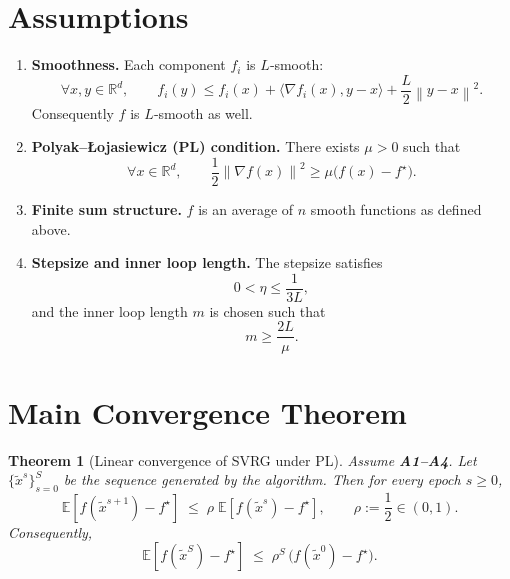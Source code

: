 \documentclass{article}
\newtheorem{theorem}{Theorem}
\newcommand{\E}{\mathbb{E}}
\newcommand{\R}{\mathbb{R}}
\newcommand{\norm}[1]{\left\|#1\right\|}
\newcommand{\inner}[2]{\langle #1,#2\rangle}
\newcommand{\grad}{\nabla}
\begin{document}
\section*{Assumptions}
\begin{enumerate}[label={A\arabic*}:, leftmargin=*, nosep]
\item \textbf{Smoothness.} Each component $f_i$ is $L$‑smooth:
\[
\forall x,y\in\R^{d},\qquad
f_i(y)\le f_i(x)+\inner{\grad f_i(x)}{y-x}+\frac{L}{2}\norm{y-x}^{2}.
\tag{A1}
\]
Consequently $f$ is $L$‑smooth as well.

\item \textbf{Polyak–\L{}ojasiewicz (PL) condition.} There exists $\mu>0$ such that
\[
\forall x\in\R^{d},\qquad
\frac{1}{2}\norm{\grad f(x)}^{2}\ge \mu\bigl(f(x)-f^{\star}\bigr).
\tag{A2}
\]

\item \textbf{Finite sum structure.} $f$ is an average of $n$ smooth functions as defined above.

\item \textbf{Stepsize and inner loop length.} The stepsize satisfies
\[
0<\eta\le \frac{1}{3L},
\tag{A3}
\]
and the inner loop length $m$ is chosen such that
\[
m\ge \frac{2L}{\mu}.
\tag{A4}
\]
\end{enumerate}

\section*{Main Convergence Theorem}
\begin{theorem}[Linear convergence of SVRG under PL]\label{thm:linear}
Assume \textbf{A1–A4}. Let $\{\tilde x^{s}\}_{s=0}^{S}$ be the sequence generated by the algorithm. Then for every epoch $s\ge0$,
\[
\E\!\left[ f(\tilde x^{s+1})-f^{\star}\right]
\;\le\;
\rho\;\E\!\left[ f(\tilde x^{s})-f^{\star}\right],
\qquad
\rho:=\frac{1}{2}\in(0,1).
\]
Consequently,
\[
\E\!\left[ f(\tilde x^{S})-f^{\star}\right]
\;\le\;
\rho^{S}\,\bigl(f(\tilde x^{0})-f^{\star}\bigr).
\]
\end{theorem}
\end{document}
